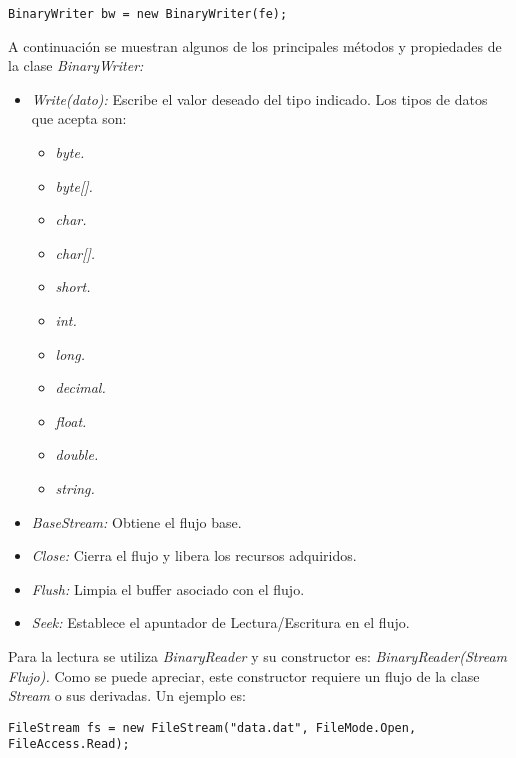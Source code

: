 \documentclass[letterpaper, 12pt]{article}
\begin{document}
\begin{justify}
\begin{verbatim}
BinaryWriter bw = new BinaryWriter(fe);
        \end{verbatim}
        A continuación se muestran algunos de los principales métodos y propiedades de la clase \emph{BinaryWriter:}
        \begin{itemize}
            \item \emph{Write(dato):} Escribe el valor deseado del tipo indicado. Los tipos de datos que acepta son:
            \begin{itemize}
                \item \emph{byte.}
                \item \emph{byte[].}
                \item \emph{char.}
                \item \emph{char[].}
                \item \emph{short.}
                \item \emph{int.}
                \item \emph{long.}
                \item \emph{decimal.}
                \item \emph{float.}
                \item \emph{double.}
                \item \emph{string.}
            \end{itemize}
            \item \emph{BaseStream:} Obtiene el flujo base.
            \item \emph{Close:} Cierra el flujo y libera los recursos adquiridos.
            \item \emph{Flush:} Limpia el buffer asociado con el flujo.
            \item \emph{Seek:} Establece el apuntador de Lectura/Escritura en el flujo.
        \end{itemize}
        Para la lectura se utiliza \emph{BinaryReader} y su constructor es: \emph{BinaryReader(Stream Flujo).} Como se puede apreciar, este constructor requiere un flujo de la clase 
        \emph{Stream} o sus derivadas. Un ejemplo es:
        \begin{verbatim}
FileStream fs = new FileStream("data.dat", FileMode.Open, FileAccess.Read);


\end{verbatim}
\end{justify}
\end{document}

